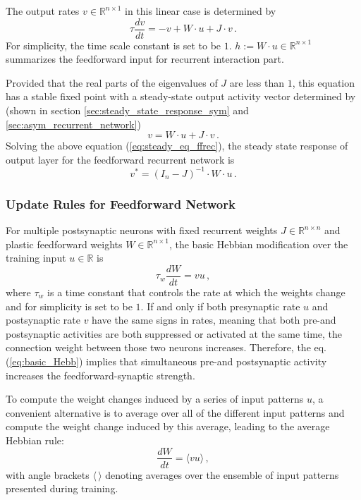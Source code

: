 \documentclass[11pt]{article}
\begin{document}
	The output rates $v \in \mathbb{R}^{n \times 1}$ in this linear case is determined by 
		\begin{equation} \label{eq:response_ffrec_network}
			\tau \frac{dv}{dt} = -v + W \cdot u + J \cdot v \,.
		\end{equation}
	For simplicity, the time scale constant is set to be $1$. $h := W \cdot u \in \mathbb{R}^{n \times 1}$ summarizes the feedforward input for recurrent interaction part. 
	
	Provided that the real parts of the eigenvalues of $J$ are less than $1$, this equation has a stable fixed point with a steady-state output activity vector determined by (shown in section \ref{sec:steady_state_response_sym} and \ref{sec:asym_recurrent_network})
		\begin{equation} \label{eq:steady_eq_ffrec}
			v = W \cdot u + J \cdot v \, .
		\end{equation}
	Solving the above equation (\ref{eq:steady_eq_ffrec}), the steady state response of output layer for the feedforward recurrent network is
		\begin{equation} \label{eq:steady_state_ffrec}
			v^* = (I_n - J)^{-1} \cdot W \cdot u \, .
		\end{equation}
	
	\subsubsection{Update Rules for Feedforward Network}
	For multiple postsynaptic neurons with fixed recurrent weights $J \in \mathbb{R}^{n \times n}$ and plastic feedforward weights $W \in \mathbb{R}^{n \times 1}$, the basic Hebbian modification over the training input $u \in \mathbb{R}$ is 
		\begin{equation} \label{eq:basic_Hebb}
			\tau_w \frac{dW}{dt} = vu \, , 
		\end{equation}
	where $\tau_w$ is a time constant that controls the rate at which the weights change and for simplicity is set to be $1$. If and only if both presynaptic rate $u$ and postsynaptic rate $v$ have the same signs in rates, meaning that both pre-and postsynaptic activities are both suppressed or activated at the same time, the connection weight between those two neurons increases. Therefore, the eq.(\ref{eq:basic_Hebb}) implies that simultaneous pre-and postsynaptic activity increases the feedforward-synaptic strength.
	
	To compute the weight changes induced by a series of input patterns $u$, a convenient alternative is to average over all of the different input patterns and compute the weight change induced by this average, leading to the average Hebbian rule:
		\begin{equation} \label{eq:average_Hebb}
			\frac{dW}{dt} = \langle vu \rangle \, ,
		\end{equation}
	with angle brackets $\langle \, \rangle$ denoting averages over the ensemble of input patterns presented during training. 
	
\end{document}
